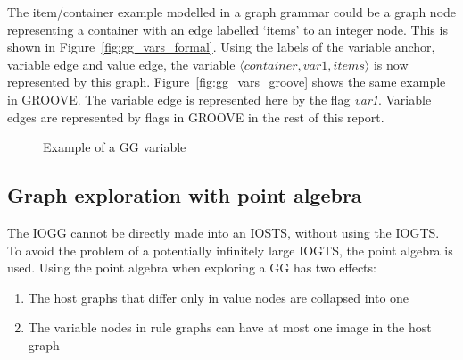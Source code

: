 The item/container example modelled in a graph grammar could be a graph node representing a container with an edge labelled `items' to an integer node. This is shown in Figure~\ref{fig:gg_vars_formal}. Using the labels of the variable anchor, variable edge and value edge, the variable $\langle \mathit{container, var1, items}\rangle$ is now represented by this graph. Figure~\ref{fig:gg_vars_groove} shows the same example in GROOVE. The variable edge is represented here by the flag \textit{var1}. Variable edges are represented by flags in GROOVE in the rest of this report. 

\begin{figure}[ht]
  \begin{center}
    \subfloat[Formal]{\label{fig:gg_vars_formal}\parbox[b]{4cm}{\centering}}
    \subfloat[GROOVE]{\label{fig:gg_vars_groove}\parbox[b]{4cm}{\centering}}
  \end{center}
  \caption{Example of a GG variable}
  \label{fig:vars-in-ggs}
\end{figure}

\subsection{Graph exploration with point algebra} 
The IOGG cannot be directly made into an IOSTS, without using the IOGTS. To avoid the problem of a potentially infinitely large IOGTS, the point algebra is used. Using the point algebra when exploring a GG has two effects:
\begin{enumerate}
\item The host graphs that differ only in value nodes are collapsed into one
\item The variable nodes in rule graphs can have at most one image in the host graph
\end{enumerate}

